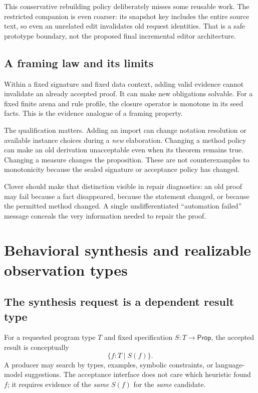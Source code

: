 \documentclass[11pt,a4paper]{article}
\newcommand{\Prop}{\mathsf{Prop}}
\theoremstyle{definition}
\theoremstyle{remark}
\begin{document}
This conservative rebuilding policy deliberately misses some reusable work.
The restricted companion is even coarser: its snapshot key includes the entire
source text, so even an unrelated edit invalidates old request identities.
That is a safe prototype boundary, not the proposed final incremental editor
architecture.

\subsection{A framing law and its limits}

Within a fixed signature and fixed data context, adding valid evidence cannot
invalidate an already accepted proof. It can make new obligations solvable.
For a fixed finite arena and rule profile, the closure operator is monotone in
its seed facts. This is the evidence analogue of a framing property.

The qualification matters. Adding an import can change notation resolution or
available instance choices during a \emph{new} elaboration. Changing a method
policy can make an old derivation unacceptable even when its theorem remains
true. Changing a measure changes the proposition. These are not counterexamples
to monotonicity because the sealed signature or acceptance policy has changed.

Clover should make that distinction visible in repair diagnostics: an old proof
may fail because a fact disappeared, because the statement changed, or because
the permitted method changed. A single undifferentiated ``automation failed''
message conceals the very information needed to repair the proof.

\section{Behavioral synthesis and realizable observation types}\label{sec:synthesis}

\subsection{The synthesis request is a dependent result type}

For a requested program type $T$ and fixed specification $S:T\to\Prop$, the
accepted result is conceptually
\[
 \{f:T\mid S(f)\}.
\]
A producer may search by types, examples, symbolic constraints, or language-model
suggestions. The acceptance interface does not care which heuristic found $f$;
it requires evidence of the \emph{same} $S(f)$ for the \emph{same} candidate.
\end{document}
